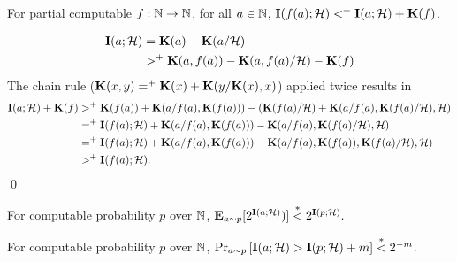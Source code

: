 \documentclass[11pt]{article}\textwidth 6.5in\textheight 9in
\begin{document}
\begin{thr}
	\label{lmm:consH}
	For partial computable $f:\N\rightarrow\N$, for all $a\in\N$, $\I(f(a);\mathcal{H})\lea\I(a;\mathcal{H})+\K(f)$. 
\end{thr}
\begin{prf}
	\begin{align*}
	\I(a;\ch)&=\K(a)-\K(a/\ch)\\
	&\gea \K(a,f(a))-\K(a,f(a)/\ch)-\K(f)
	\end{align*}
The chain rule ($\K(x,y) \eqa \K(x) + \K(y/\K(x),x)$) applied twice results in
\begin{align*}
\I(a;\ch)+\K(f)&\gea \K(f(a))+\K(a/f(a),\K(f(a)))-(\K(f(a)/\ch)+\K(a/f(a),\K(f(a)/\ch),\ch)\\\
&\eqa \I(f(a);\ch)+\K(a/f(a),\K(f(a)))-\K(a/f(a),\K(f(a)/\ch),\ch)\\
&\eqa  \I(f(a);\ch)+\K(a/f(a),\K(f(a)))-\K(a/f(a),\K(f(a)),\K(f(a)/\ch),\ch)\\
&\gea \I(f(a);\ch).
\end{align*}
\qed
\end{prf}
\begin{cor}
For computable probability $p$ over $\N$, $\E_{a\sim p}[2^{\I(a;\ch)})] \lem 2^{\I(p;\ch)}.$
\end{cor}
\begin{cor}
\label{cor:consinf}
For computable probability $p$ over $\N$, $\Pr_{a\sim p}\left[\I(a;\ch)>\I(p;\ch)+m\right]\lem 2^{-m}$.
\end{cor}
\end{document}
